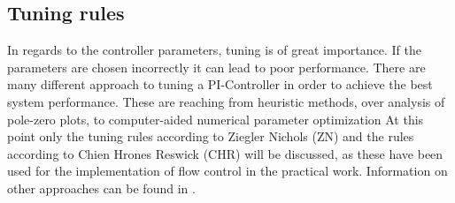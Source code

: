 \subsection{Tuning rules}
In regards to the controller parameters, tuning is of great importance. If the parameters are chosen incorrectly it can lead to poor performance. There are many different approach to tuning a PI-Controller in order to achieve the best system performance. These are reaching from heuristic methods, over analysis of pole-zero plots, to computer-aided numerical parameter optimization \cite{Reg_10} At this point only the tuning rules according to Ziegler Nichols (ZN) and the rules according to Chien Hrones Reswick (CHR) will be discussed, as these have been used for the implementation of flow control in the practical work.  Information on other approaches can be found in \cite{Reg_11}.

